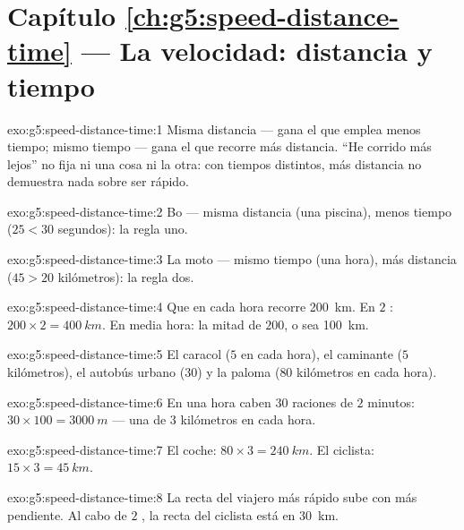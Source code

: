 \section*{Capítulo \ref{ch:g5:speed-distance-time} --- La velocidad: distancia y tiempo}

\begin{solution}{exo:g5:speed-distance-time:1}
Misma distancia --- gana el que emplea menos tiempo; mismo tiempo ---
gana el que recorre más distancia. ``He corrido más lejos'' no fija ni
una cosa ni la otra: con tiempos distintos, más distancia no demuestra
nada sobre ser rápido.
\end{solution}

\begin{solution}{exo:g5:speed-distance-time:2}
Bo --- misma distancia (una piscina), menos tiempo ($25 < 30$
segundos): la regla uno.
\end{solution}

\begin{solution}{exo:g5:speed-distance-time:3}
La moto --- mismo tiempo (una hora), más distancia ($45 > 20$
kilómetros): la regla dos.
\end{solution}

\begin{solution}{exo:g5:speed-distance-time:4}
Que en cada hora recorre \qty{200}{km}. En $2$ :
$200 \times 2 = \qty{400}{km}$. En media hora: la mitad de $200$, o
sea \qty{100}{km}.
\end{solution}

\begin{solution}{exo:g5:speed-distance-time:5}
El caracol ($5$  en cada hora), el caminante ($5$
kilómetros), el autobús urbano ($30$) y la paloma ($80$ kilómetros en
cada hora).
\end{solution}

\begin{solution}{exo:g5:speed-distance-time:6}
En una hora caben $30$ raciones de $2$ minutos:
$30 \times 100 = \qty{3000}{m}$ --- una  de $3$ kilómetros
en cada hora.
\end{solution}

\begin{solution}{exo:g5:speed-distance-time:7}
El coche: $80 \times 3 = \qty{240}{km}$. El ciclista:
$15 \times 3 = \qty{45}{km}$.
\end{solution}

\begin{solution}{exo:g5:speed-distance-time:8}
La recta del viajero más rápido sube con más pendiente. Al cabo de $2$
, la recta del ciclista está en \qty{30}{km}.
\end{solution}

